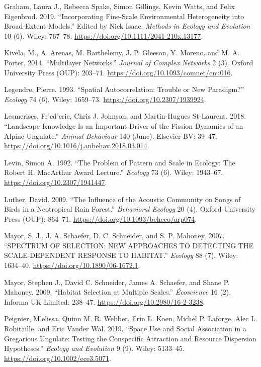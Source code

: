 \documentclass[]{article}
\begin{document}
\leavevmode\hypertarget{ref-Graham_2019a}{}%
Graham, Laura J., Rebecca Spake, Simon Gillings, Kevin Watts, and Felix Eigenbrod. 2019. ``Incorporating Fine-Scale Environmental Heterogeneity into Broad-Extent Models.'' Edited by Nick Isaac. \emph{Methods in Ecology and Evolution} 10 (6). Wiley: 767--78. \url{https://doi.org/10.1111/2041-210x.13177}.

\leavevmode\hypertarget{ref-Kivela_2014}{}%
Kivela, M., A. Arenas, M. Barthelemy, J. P. Gleeson, Y. Moreno, and M. A. Porter. 2014. ``Multilayer Networks.'' \emph{Journal of Complex Networks} 2 (3). Oxford University Press (OUP): 203--71. \url{https://doi.org/10.1093/comnet/cnu016}.

\leavevmode\hypertarget{ref-Legendre_1993}{}%
Legendre, Pierre. 1993. ``Spatial Autocorrelation: Trouble or New Paradigm?'' \emph{Ecology} 74 (6). Wiley: 1659--73. \url{https://doi.org/10.2307/1939924}.

\leavevmode\hypertarget{ref-Lesmerises_2018}{}%
Lesmerises, Fr\a'ed\a'eric, Chris J. Johnson, and Martin-Hugues St-Laurent. 2018. ``Landscape Knowledge Is an Important Driver of the Fission Dynamics of an Alpine Ungulate.'' \emph{Animal Behaviour} 140 (June). Elsevier BV: 39--47. \url{https://doi.org/10.1016/j.anbehav.2018.03.014}.

\leavevmode\hypertarget{ref-Levin_1992}{}%
Levin, Simon A. 1992. ``The Problem of Pattern and Scale in Ecology: The Robert H. MacArthur Award Lecture.'' \emph{Ecology} 73 (6). Wiley: 1943--67. \url{https://doi.org/10.2307/1941447}.

\leavevmode\hypertarget{ref-Luther_2009}{}%
Luther, David. 2009. ``The Influence of the Acoustic Community on Songs of Birds in a Neotropical Rain Forest.'' \emph{Behavioral Ecology} 20 (4). Oxford University Press (OUP): 864--71. \url{https://doi.org/10.1093/beheco/arp074}.

\leavevmode\hypertarget{ref-Mayor_2007}{}%
Mayor, S. J., J. A. Schaefer, D. C. Schneider, and S. P. Mahoney. 2007. ``SPECTRUM OF SELECTION: NEW APPROACHES TO DETECTING THE SCALE-DEPENDENT RESPONSE TO HABITAT.'' \emph{Ecology} 88 (7). Wiley: 1634--40. \url{https://doi.org/10.1890/06-1672.1}.

\leavevmode\hypertarget{ref-Mayor_2009}{}%
Mayor, Stephen J., David C. Schneider, James A. Schaefer, and Shane P. Mahoney. 2009. ``Habitat Selection at Multiple Scales.'' \emph{Écoscience} 16 (2). Informa UK Limited: 238--47. \url{https://doi.org/10.2980/16-2-3238}.

\leavevmode\hypertarget{ref-Peignier_2019}{}%
Peignier, M\a'elissa, Quinn M. R. Webber, Erin L. Koen, Michel P. Laforge, Alec L. Robitaille, and Eric Vander Wal. 2019. ``Space Use and Social Association in a Gregarious Ungulate: Testing the Conspecific Attraction and Resource Dispersion Hypotheses.'' \emph{Ecology and Evolution} 9 (9). Wiley: 5133--45. \url{https://doi.org/10.1002/ece3.5071}.
\end{document}
